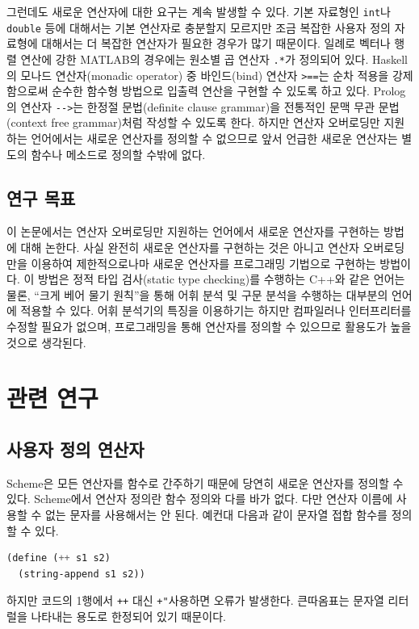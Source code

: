 \documentclass[titlepage]{pnureport}
\begin{document}
그런데도 새로운 연산자에 대한 요구는 계속 발생할 수 있다. 기본 자료형인 \texttt{int}나 \texttt{double} 등에 대해서는 기본 연산자로 충분할지 모르지만 조금 복잡한 사용자 정의 자료형에 대해서는 더 복잡한 연산자가 필요한 경우가 많기 때문이다. 일례로 벡터나 행렬 연산에 강한 MATLAB의 경우에는 원소별 곱 연산자 \verb|.*|가 정의되어 있다\cite{battles04}. Haskell의 모나드 연산자(monadic operator) 중 바인드(bind) 연산자 \verb|>==|는 순차 적용을 강제함으로써 순수한 함수형 방법으로 입출력 연산을 구현할 수 있도록 하고 있다\cite{hutton16}. Prolog의 연산자 \verb|-->|는 한정절 문법(definite clause grammar)을 전통적인 문맥 무관 문법(context free grammar)처럼 작성할 수 있도록 한다\cite{nogatz19}. 하지만 연산자 오버로딩만 지원하는 언어에서는 새로운 연산자를 정의할 수 없으므로 앞서 언급한 새로운 연산자는 별도의 함수나 메소드로 정의할 수밖에 없다.

\section{연구 목표}
이 논문에서는 연산자 오버로딩만 지원하는 언어에서 새로운 연산자를 구현하는 방법에 대해 논한다. 사실 완전히 새로운 연산자를 구현하는 것은 아니고 연산자 오버로딩만을 이용하여 제한적으로나마 새로운 연산자를 프로그래밍 기법으로 구현하는 방법이다. 이 방법은 정적 타입 검사(static type checking)를 수행하는 C++와 같은 언어는 물론, ``크게 베어 물기 원칙''을 통해 어휘 분석 및 구문 분석을 수행하는 대부분의 언어에 적용할 수 있다. 어휘 분석기의 특징을 이용하기는 하지만 컴파일러나 인터프리터를 수정할 필요가 없으며, 프로그래밍을 통해 연산자를 정의할 수 있으므로 활용도가 높을 것으로 생각된다.

\chapter{관련 연구}
\label{ch:related}

\section{사용자 정의 연산자}
Scheme은 모든 연산자를 함수로 간주하기 때문에 당연히 새로운 연산자를 정의할 수 있다. Scheme에서 연산자 정의란 함수 정의와 다를 바가 없다. 다만 연산자 이름에 사용할 수 없는 문자를 사용해서는 안 된다. 예컨대 다음과 같이 문자열 접합 함수를 정의할 수 있다.
\begin{lstlisting}[language=lisp]
(define (++ s1 s2)
  (string-append s1 s2))
\end{lstlisting}
하지만 코드의 1행에서 \texttt{++} 대신 \texttt{+"}\을 사용하면 오류가 발생한다. 큰따옴표는 문자열 리터럴을 나타내는 용도로 한정되어 있기 때문이다.
\end{document}
